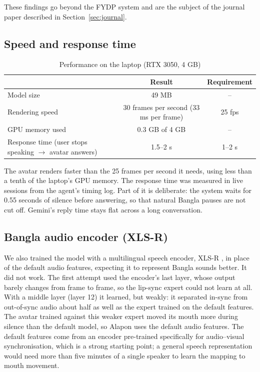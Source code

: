\noindent
These findings go beyond the FYDP system and are the subject of the journal paper described in Section~\ref{sec:journal}.

\subsection{Speed and response time}
\label{sec:speed}

\begin{table}[H]
    \centering
    \caption{Performance on the laptop (RTX 3050, 4 GB)}
    \label{tab:performance}
    \renewcommand{\arraystretch}{1.3}
    \begin{tabular}{p{5.6cm}cc}
        \hline
        & \textbf{Result} & \textbf{Requirement} \\
        \hline
        Model size & 49 MB & -- \\
        Rendering speed & 30 frames per second (33 ms per frame) & 25 fps \\
        GPU memory used & 0.3 GB of 4 GB & -- \\
        Response time (user stops speaking $\rightarrow$ avatar answers) & 1.5--2 s & 1--2 s \\
        \hline
    \end{tabular}
\end{table}

\noindent
The avatar renders faster than the 25 frames per second it needs, using less than a tenth of the laptop's GPU memory. The response time was measured in live sessions from the agent's timing log. Part of it is deliberate: the system waits for 0.55 seconds of silence before answering, so that natural Bangla pauses are not cut off. Gemini's reply time stays flat across a long conversation.

\subsection{Bangla audio encoder (XLS-R)}
\label{sec:xlsr}

We also trained the model with a multilingual speech encoder, XLS-R \cite{babu2022xlsr}, in place of the default audio features, expecting it to represent Bangla sounds better. It did not work. The first attempt used the encoder's last layer, whose output barely changes from frame to frame, so the lip-sync expert could not learn at all. With a middle layer (layer 12) it learned, but weakly: it separated in-sync from out-of-sync audio about half as well as the expert trained on the default features. The avatar trained against this weaker expert moved its mouth more during silence than the default model, so Alapon uses the default audio features. The default features come from an encoder pre-trained specifically for audio--visual synchronisation, which is a strong starting point; a general speech representation would need more than five minutes of a single speaker to learn the mapping to mouth movement.

